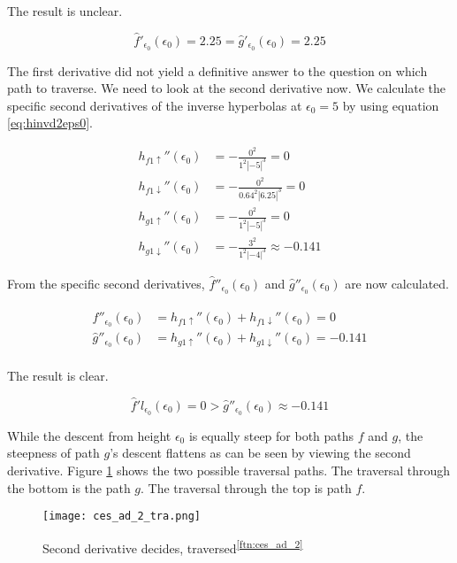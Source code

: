 The result is unclear.

$$\hat{f}'_{\epsilon_0}(\epsilon_0) = 2.25 = \hat{g}'_{\epsilon_0}(\epsilon_0) = 2.25$$

The first derivative did not yield a definitive answer to the question on which path to traverse. We need to look at the second derivative now. We calculate the specific second derivatives of the inverse hyperbolas at $\epsilon_0 = 5$ by using equation \ref{eq:hinvd2eps0}.

\begin{align*}
	h_{f1\uparrow}''(\epsilon_0) &= -\frac{0^2}{1^2 \left| -5 \right|^3} = 0\\
	h_{f1\downarrow}''(\epsilon_0) &= -\frac{0^2}{0.64^2 \left| 6.25 \right|^3} = 0\\
	h_{g1\uparrow}''(\epsilon_0) &= -\frac{0^2}{1^2 \left| -5 \right|^3} = 0\\
	h_{g1\downarrow}''(\epsilon_0) &= -\frac{3^2}{1^2 \left| -4 \right|^3} \approx -0.141 
\end{align*}

From the specific second derivatives, $\hat{f}''_{\epsilon_0}(\epsilon_0)$ and $\hat{g}''_{\epsilon_0}(\epsilon_0)$ are now calculated.

\begin{align*}
	\hat{f}''_{\epsilon_0}(\epsilon_0) &= h_{f1\uparrow}''(\epsilon_0) + h_{f1\downarrow}''(\epsilon_0) = 0\\
	\hat{g}''_{\epsilon_0}(\epsilon_0) &= h_{g1\uparrow}''(\epsilon_0) + h_{g1\downarrow}''(\epsilon_0) = -0.141\\
\end{align*}

The result is clear.

$$\hat{f}'l_{\epsilon_0}(\epsilon_0) = 0 > \hat{g}''_{\epsilon_0}(\epsilon_0) \approx -0.141$$

While the descent from height $\epsilon_0$ is equally steep for both paths $f$ and $g$, the steepness of path $g$'s descent flattens as can be seen by viewing the second derivative. Figure \ref{fig:ces_ad_2_tra} shows the two possible traversal paths. The traversal through the bottom is the path $g$. The traversal through the top is path $f$.

\begin{figure}[H]
	\centering
    
    \texttt{[image: ces\_ad\_2\_tra.png]}
		
	\caption{Second derivative decides, traversed\textsuperscript{\ref{ftn:ces_ad_2}}}
    \label{fig:ces_ad_2_tra}
\end{figure}
	
